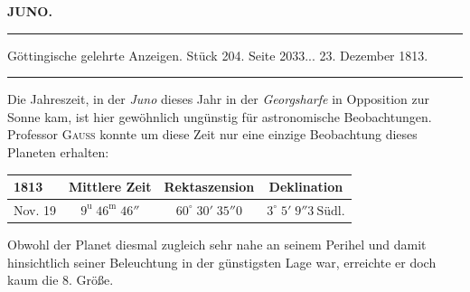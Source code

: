 \clearpage{}\hypertarget{native-377-lower}{}\label{native-377-lower}
\begin{center}\textbf{JUNO.}\par\vspace{4pt}\hrule\vspace{4pt}\fontsize{10}{12}\selectfont Göttingische gelehrte Anzeigen. Stück 204. Seite 2033\;... 23. Dezember 1813.\par\vspace{4pt}\hrule\vspace{4pt}\end{center}


\par\indent Die Jahreszeit, in der \emph{Juno} dieses Jahr in der \emph{Georgsharfe} in Opposition zur Sonne kam, ist hier gewöhnlich ungünstig für astronomische Beobachtungen. Professor \textsc{Gauss} konnte um diese Zeit nur eine einzige Beobachtung dieses Planeten erhalten:
\begin{center}\fontsize{10}{12}\selectfont\setlength{\tabcolsep}{4pt}\renewcommand{\arraystretch}{1.15}\begin{tabular}{l|c|c|c}
1813 & Mittlere Zeit & Rektaszension & Deklination\\\hline
Nov. 19 & $9^{\mathrm u}\;46^{\mathrm m}\;46''$ & $60^\circ\;30'\;35''0$ & $3^\circ\;5'\;9''3\ \text{Südl.}$\\
\end{tabular}\end{center}
\par\indent Obwohl der Planet diesmal zugleich sehr nahe an seinem Perihel und damit hinsichtlich seiner Beleuchtung in der günstigsten Lage war, erreichte er doch kaum die 8. Größe.

